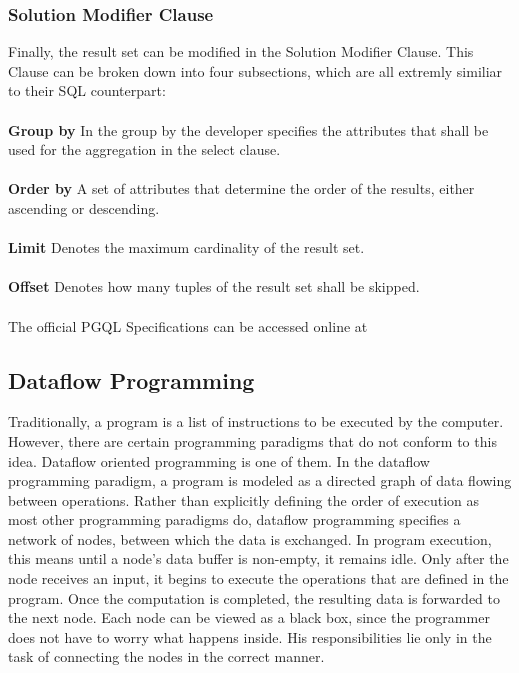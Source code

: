 \documentclass[11pt,singlecolumn]{scrartcl}
\begin{document}
\subsubsection{Solution Modifier Clause}
Finally, the result set can be modified in the Solution Modifier Clause. This Clause can be broken down into four subsections, which are all extremly similiar to their SQL counterpart:\\\\
\textbf{Group by} \quad In the group by the developer specifies the attributes that shall be used for the aggregation in the select clause.\\\\
\textbf{Order by} \quad A set of attributes that determine the order of the results, either ascending or descending.\\\\
\textbf{Limit} \quad Denotes the maximum cardinality of the result set.\\\\
\textbf{Offset} \quad Denotes how many tuples of the result set shall be skipped.\\\\

\noindent The official PGQL Specifications can be accessed online at \cite{PGQLSpec}

\subsection{Dataflow Programming}
Traditionally, a program is a list of instructions to be executed by the computer. However, there are certain programming paradigms that do not conform to this idea. Dataflow oriented programming is one of them. In the dataflow programming paradigm, a program is modeled as a directed graph of data flowing between operations.  Rather than explicitly defining the order of execution as most other programming paradigms do, dataflow programming specifies a network of nodes, between which the data is exchanged. In program execution, this means until a node's data buffer is non-empty, it remains idle. Only after the node receives an input, it begins to execute the operations that are defined in the program. Once the computation is completed, the resulting data is forwarded to the next node. Each node can be viewed as a black box, since the programmer does not have to worry what happens inside. His responsibilities lie only in the task of connecting the nodes in the correct manner.
\end{document}

